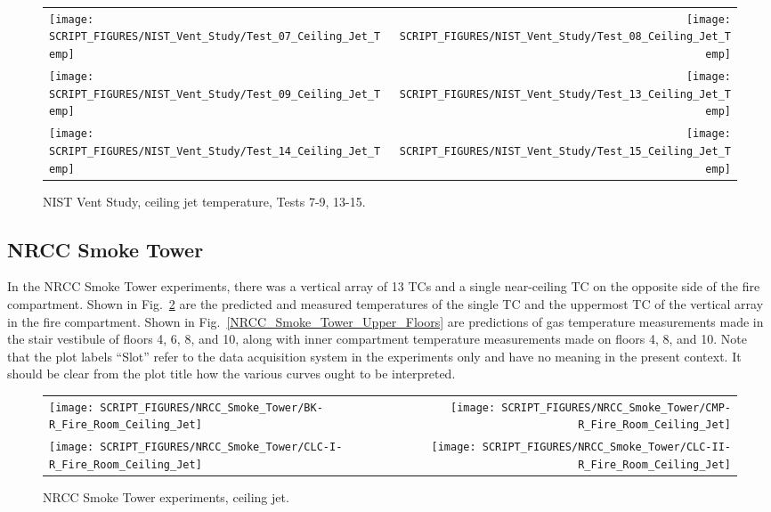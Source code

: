 \begin{figure}[!h]
\begin{tabular*}{\textwidth}{l@{\extracolsep{\fill}}r}
\texttt{[image: SCRIPT\_FIGURES/NIST\_Vent\_Study/Test\_07\_Ceiling\_Jet\_Temp]} &
\texttt{[image: SCRIPT\_FIGURES/NIST\_Vent\_Study/Test\_08\_Ceiling\_Jet\_Temp]} \\
\texttt{[image: SCRIPT\_FIGURES/NIST\_Vent\_Study/Test\_09\_Ceiling\_Jet\_Temp]} &
\texttt{[image: SCRIPT\_FIGURES/NIST\_Vent\_Study/Test\_13\_Ceiling\_Jet\_Temp]} \\
\texttt{[image: SCRIPT\_FIGURES/NIST\_Vent\_Study/Test\_14\_Ceiling\_Jet\_Temp]} &
\texttt{[image: SCRIPT\_FIGURES/NIST\_Vent\_Study/Test\_15\_Ceiling\_Jet\_Temp]}
\end{tabular*}
\caption[NIST Vent Study, ceiling jet temperature, Tests 7-9, 13-15]
{NIST Vent Study, ceiling jet temperature, Tests 7-9, 13-15.}
\label{NIST_Vent_Study_Ceiling_Jet_2}
\end{figure}


\clearpage

\subsection{NRCC Smoke Tower}

In the NRCC Smoke Tower experiments, there was a vertical array of 13 TCs and a single near-ceiling TC on the opposite side of the fire compartment. Shown in Fig.~\ref{NRCC_Smoke_Tower_Ceiling_Jet} are the predicted and measured temperatures of the single TC and the uppermost TC of the vertical array in the fire compartment. Shown in Fig.~\ref{NRCC_Smoke_Tower_Upper_Floors} are predictions of gas temperature measurements made in the stair vestibule of floors 4, 6, 8, and 10, along with inner compartment temperature measurements made on floors 4, 8, and 10. Note that the plot labels ``Slot'' refer to the data acquisition system in the experiments only and have no meaning in the present context. It should be clear from the plot title how the various curves ought to be interpreted.


\begin{figure}[!ht]
\begin{tabular*}{\textwidth}{l@{\extracolsep{\fill}}r}
\texttt{[image: SCRIPT\_FIGURES/NRCC\_Smoke\_Tower/BK-R\_Fire\_Room\_Ceiling\_Jet]} &
\texttt{[image: SCRIPT\_FIGURES/NRCC\_Smoke\_Tower/CMP-R\_Fire\_Room\_Ceiling\_Jet]} \\
\texttt{[image: SCRIPT\_FIGURES/NRCC\_Smoke\_Tower/CLC-I-R\_Fire\_Room\_Ceiling\_Jet]} &
\texttt{[image: SCRIPT\_FIGURES/NRCC\_Smoke\_Tower/CLC-II-R\_Fire\_Room\_Ceiling\_Jet]}
\end{tabular*}
\caption[NRCC Smoke Tower experiments, ceiling jet]{NRCC Smoke Tower experiments, ceiling jet.}
\label{NRCC_Smoke_Tower_Ceiling_Jet}
\end{figure}

